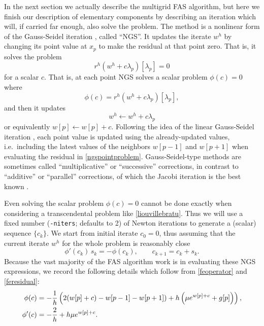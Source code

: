 \documentclass[letterpaper,final,12pt,reqno]{amsart}
\begin{document}
In the next section we actually describe the multigrid FAS algorithm, but here we finish our description of elementary components by describing an iteration which will, if carried far enough, also solve the problem.  The method is a nonlinear form of the Gauss-Seidel iteration \cite{Briggsetal2000}, called ``NGS''.  It updates the iterate $w^h$ by changing its point value at $x_p$ to make the residual at that point zero.  That is, it solves the problem
\begin{equation}
r^h(w^h + c \lambda_p)[\lambda_p] = 0  \label{ngspointproblem}
\end{equation}
for a scalar $c$.  That is, at each point NGS solves a scalar problem $\phi(c)=0$ where
\begin{equation}
  \phi(c) = r^h(w^h + c \lambda_p)[\lambda_p], \label{ngspointresidual}
\end{equation}
and then it updates
\begin{equation}
  w^h \leftarrow w^h + c \lambda_p  \label{ngspointupdate}
\end{equation}
or equivalently $w[p] \leftarrow w[p] + c$.  Following the idea of the linear Gauss-Seidel iteration \cite{Greenbaum1997}, each point value is updated using the already-updated values, i.e.~including the latest values of the neighbors $w[p-1]$ and $w[p+1]$ when evaluating the residual in \eqref{ngspointproblem}.  Gauss-Seidel-type methods are sometimes called ``multiplicative'' or ``successive'' corrections, in contrast to ``additive'' or ``parallel'' corrections, of which the Jacobi iteration is the best known \cite{Bueler2021}.

Even solving the scalar problem $\phi(c)=0$ cannot be done exactly when considering a transcendental problem like \eqref{liouvillebratu}.  Thus we will use a fixed number (\texttt{-niters}; defaults to 2) of Newton iterations to generate a (scalar) sequence $\{c_k\}$.  We start from initial iterate $c_0=0$, thus assuming that the current iterate $w^h$ for the whole problem is reasonably close
\begin{equation}
\phi'(c_k)\, s_k = -\phi(c_k),  \qquad  c_{k+1} = c_k + s_k. \label{ngsnewton}
\end{equation}
Because the vast majority of the FAS algorithm work is in evaluating these NGS expressions, we record the following details which follow from \eqref{feoperator} and \eqref{feresidual}:
\begin{align}
   \phi(c) &= -\frac{1}{h} \left(2(w[p]+c) - w[p-1] - w[p+1]) + h \left(\mu e^{w[p]+c} + g[p]\right)\right), \label{ngsnewtondetails} \\
   \phi'(c) &= -\frac{2}{h} + h \mu e^{w[p]+c}. \notag
\end{align}
\end{document}
